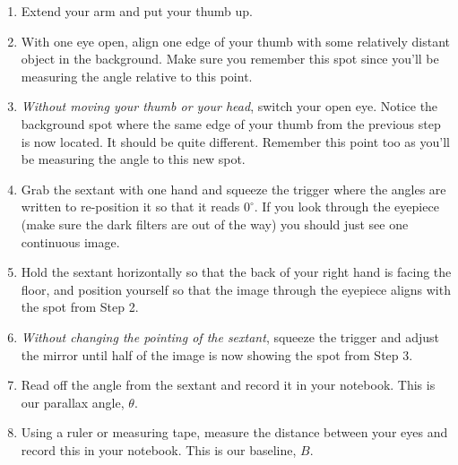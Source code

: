 \documentclass[11pt]{article}
\begin{document}
\begin{enumerate}[label=Step \arabic*:]
    \item Extend your arm and put your thumb up.
    
    \item With one eye open, align one edge of your thumb with some relatively distant object in the background. Make sure you remember this spot since you'll be measuring the angle relative to this point.
    
    \item \textsl{Without moving your thumb or your head}, switch your open eye. Notice the background spot where the same edge of your thumb from the previous step is now located. It should be quite different. Remember this point too as you'll be measuring the angle to this new spot. 
    
    \item Grab the sextant with one hand and squeeze the trigger where the angles are written to re-position it so that it reads $0^\circ$. If you look through the eyepiece (make sure the dark filters are out of the way) you should just see one continuous image.
    
    \item Hold the sextant horizontally so that the back of your right hand is facing the floor, and position yourself so that the image through the eyepiece aligns with the spot from Step 2.
    
    \item \textsl{Without changing the pointing of the sextant}, squeeze the trigger and adjust the mirror until half of the image is now showing the spot from Step 3. 
    
    \item Read off the angle from the sextant and record it in your notebook. This is our parallax angle, $\theta$.
    
    \item Using a ruler or measuring tape, measure the distance between your eyes and record this in your notebook. This is our baseline, $B$.
    
\end{enumerate}

\bigskip
\end{document}
